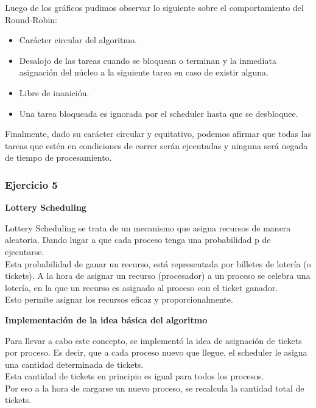 \indent Luego de los gráficos pudimos observar lo siguiente sobre el comportamiento del Round-Robin:\\
\begin{itemize}
\item  Carácter circular del algoritmo.
\item  Desalojo de las tareas cuando se bloquean o terminan y la inmediata asignación del núcleo a la siguiente tarea en caso de existir alguna.
\item  Libre de inanición.
\item  Una tarea bloqueada es ignorada por el scheduler hasta que se desbloquee.
\end{itemize}

\indent Finalmente, dado su carácter circular y equitativo, podemos afirmar que todas las tareas que 
estén en condiciones de correr serán ejecutadas y ninguna será negada de tiempo de procesamiento.\\

\subsubsection[Resolución Ejercicio 5]{Ejercicio 5}

\begin{center}
\textbf{Lottery Scheduling} 
\end{center}

\indent Lottery Scheduling se trata de un mecanismo que asigna recursos de manera aleatoria. Dando lugar a que cada proceso
tenga una probabilidad p de ejecutarse. \\
Esta probabilidad de ganar un recurso, está representada por billetes de lotería (o tickets). A la hora de asignar un recurso
(procesador) a un proceso se celebra una lotería, en la que un recurso es asignado al proceso con el ticket ganador.\\
Esto permite asignar los recursos eficaz y proporcionalmente.\\

\begin{center}
\textbf{Implementación de la idea básica del algoritmo} 
\end{center}

\indent Para llevar a cabo este concepto, se implementó la idea de asignación de tickets por proceso. 
Es decir, que a cada proceso nuevo que llegue, el scheduler le asigna una cantidad determinada de tickets. \\
Esta cantidad de tickets en principio es igual para todos los procesos.\\
Por eso a la hora de cargarse un nuevo proceso, se recalcula la cantidad total de tickets.\\

